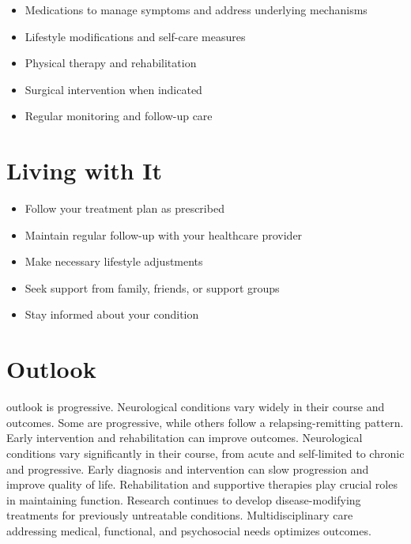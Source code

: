 \begin{itemize}[noitemsep]
  \item Medications to manage symptoms and address underlying mechanisms
  \item Lifestyle modifications and self-care measures
  \item Physical therapy and rehabilitation
  \item Surgical intervention when indicated
  \item Regular monitoring and follow-up care
\end{itemize}
\section{Living with It}
\begin{itemize}[noitemsep]
  \item Follow your treatment plan as prescribed
  \item Maintain regular follow-up with your healthcare provider
  \item Make necessary lifestyle adjustments
  \item Seek support from family, friends, or support groups
  \item Stay informed about your condition
\end{itemize}
\section{Outlook}
outlook is progressive. Neurological conditions vary widely in their course and outcomes. Some are progressive, while others follow a relapsing-remitting pattern. Early intervention and rehabilitation can improve outcomes. Neurological conditions vary significantly in their course, from acute and self-limited to chronic and progressive. Early diagnosis and intervention can slow progression and improve quality of life. Rehabilitation and supportive therapies play crucial roles in maintaining function. Research continues to develop disease-modifying treatments for previously untreatable conditions. Multidisciplinary care addressing medical, functional, and psychosocial needs optimizes outcomes.
